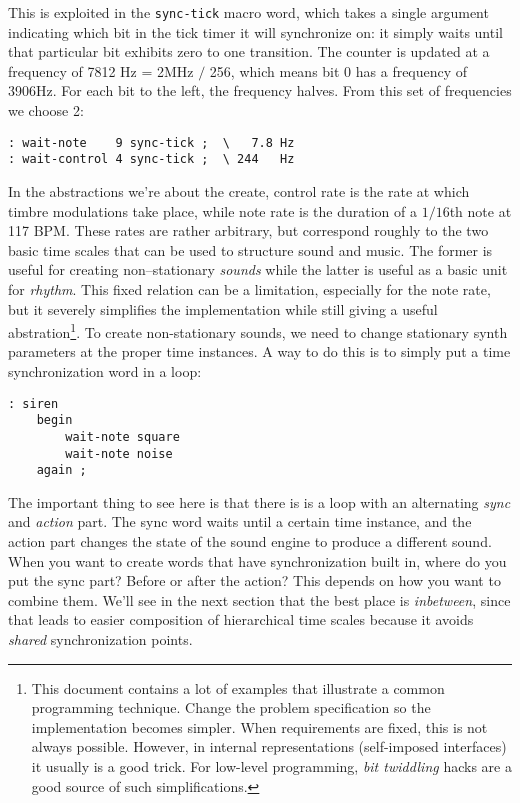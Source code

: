 \documentclass[12pt]{article}
\begin{document}
This is exploited in the \verb|sync-tick| macro word, which takes a
single argument indicating which bit in the tick timer it will
synchronize on: it simply waits until that particular bit exhibits
zero to one transition. The counter is updated at a frequency of 7812
Hz = 2MHz $/$ 256, which means bit 0 has a frequency of 3906Hz. For
each bit to the left, the frequency halves. From this set of
frequencies we choose 2:
\begin{verbatim}
: wait-note    9 sync-tick ;  \   7.8 Hz
: wait-control 4 sync-tick ;  \ 244   Hz
\end{verbatim}

In the abstractions we're about the create, control rate is the rate
at which timbre modulations take place, while note rate is the
duration of a $1/16$th note at 117 BPM. These rates are rather
arbitrary, but correspond roughly to the two basic time scales that
can be used to structure sound and music. The former is useful for
creating non--stationary \emph{sounds} while the latter is useful as a
basic unit for \emph{rhythm}. This fixed relation can be a limitation,
especially for the note rate, but it severely simplifies the
implementation while still giving a useful abstration\footnote{This
  document contains a lot of examples that illustrate a common
  programming technique. Change the problem specification so the
  implementation becomes simpler. When requirements are fixed, this is
  not always possible. However, in internal representations
  (self-imposed interfaces) it usually is a good trick. For low-level
  programming, \emph{bit twiddling} hacks are a good source of such
  simplifications.}. To create non-stationary sounds, we need to
change stationary synth parameters at the proper time instances. A way
to do this is to simply put a time synchronization word in a loop:
\begin{verbatim}
: siren
    begin
        wait-note square
        wait-note noise
    again ;
\end{verbatim}
The important thing to see here is that there is is a loop with an
alternating \emph{sync} and \emph{action} part. The sync word waits
until a certain time instance, and the action part changes the state
of the sound engine to produce a different sound. When you want to
create words that have synchronization built in, where do you put the
sync part?  Before or after the action? This depends on how you want
to combine them. We'll see in the next section that the best place is
\emph{inbetween}, since that leads to easier composition of
hierarchical time scales because it avoids \emph{shared}
synchronization points.
\end{document}
